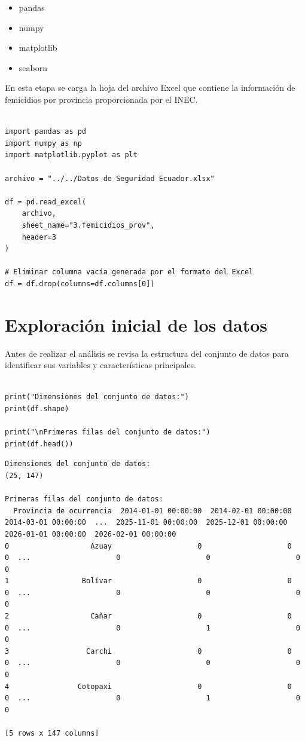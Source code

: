 \documentclass[11pt]{article}
\begin{document}
\begin{itemize}
\item pandas
\item numpy
\item matplotlib
\item seaborn
\end{itemize}

En esta etapa se carga la hoja del archivo Excel que contiene la información
de femicidios por provincia proporcionada por el INEC.

\begin{verbatim}

import pandas as pd
import numpy as np
import matplotlib.pyplot as plt

archivo = "../../Datos de Seguridad Ecuador.xlsx"

df = pd.read_excel(
    archivo,
    sheet_name="3.femicidios_prov",
    header=3
)

# Eliminar columna vacía generada por el formato del Excel
df = df.drop(columns=df.columns[0])

\end{verbatim}
\section{Exploración inicial de los datos}
\label{sec:org2cf2bbb}

Antes de realizar el análisis se revisa la estructura del conjunto de datos para
identificar sus variables y características principales.
\begin{verbatim}

print("Dimensiones del conjunto de datos:")
print(df.shape)

print("\nPrimeras filas del conjunto de datos:")
print(df.head())

\end{verbatim}
\begin{verbatim}
Dimensiones del conjunto de datos:
(25, 147)

Primeras filas del conjunto de datos:
  Provincia de ocurrencia  2014-01-01 00:00:00  2014-02-01 00:00:00  2014-03-01 00:00:00  ...  2025-11-01 00:00:00  2025-12-01 00:00:00  2026-01-01 00:00:00  2026-02-01 00:00:00
0                   Azuay                    0                    0                    0  ...                    0                    0                    0                    0
1                 Bolívar                    0                    0                    0  ...                    0                    0                    0                    0
2                   Cañar                    0                    0                    0  ...                    0                    1                    0                    0
3                  Carchi                    0                    0                    0  ...                    0                    0                    0                    0
4                Cotopaxi                    0                    0                    0  ...                    0                    1                    0                    0

[5 rows x 147 columns]
\end{verbatim}
\end{document}
